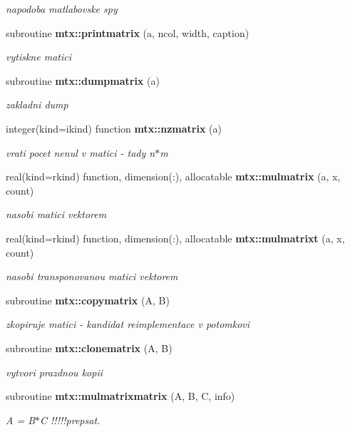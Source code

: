 \begin{DoxyCompactItemize}
\begin{DoxyCompactList}\small\item\em napodoba matlabovske spy \end{DoxyCompactList}\item 
subroutine {\bf mtx\+::printmatrix} (a, ncol, width, caption)
\begin{DoxyCompactList}\small\item\em vytiskne matici \end{DoxyCompactList}\item 
subroutine {\bf mtx\+::dumpmatrix} (a)
\begin{DoxyCompactList}\small\item\em zakladni dump \end{DoxyCompactList}\item 
integer(kind=ikind) function {\bf mtx\+::nzmatrix} (a)
\begin{DoxyCompactList}\small\item\em vrati pocet nenul v matici -\/ tady n$\ast$m \end{DoxyCompactList}\item 
real(kind=rkind) function, dimension(\+:), allocatable {\bf mtx\+::mulmatrix} (a, x, count)
\begin{DoxyCompactList}\small\item\em nasobi matici vektorem \end{DoxyCompactList}\item 
real(kind=rkind) function, dimension(\+:), allocatable {\bf mtx\+::mulmatrixt} (a, x, count)
\begin{DoxyCompactList}\small\item\em nasobi transponovanou matici vektorem \end{DoxyCompactList}\item 
subroutine {\bf mtx\+::copymatrix} (A, B)
\begin{DoxyCompactList}\small\item\em zkopiruje matici -\/ kandidat reimplementace v potomkovi \end{DoxyCompactList}\item 
subroutine {\bf mtx\+::clonematrix} (A, B)
\begin{DoxyCompactList}\small\item\em vytvori prazdnou kopii \end{DoxyCompactList}\item 
subroutine {\bf mtx\+::mulmatrixmatrix} (A, B, C, info)
\begin{DoxyCompactList}\small\item\em A = B$\ast$C !!!!!prepsat. \end{DoxyCompactList}\item 

\end{DoxyCompactItemize}
